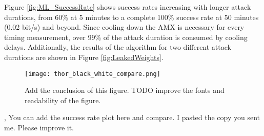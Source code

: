 Figure \ref{fig:ML_SuccessRate} shows success rates increasing with longer attack durations, from 60\% at 5 minutes to a complete 100\% success rate at 50 minutes (0.02 bit/s) and beyond. Since cooling down the AMX is necessary for every timing measurement, over 99\% of the attack duration is consumed by cooling delays. Additionally, the results of the algorithm for two different attack durations are shown in Figure \ref{fig:LeakedWeights}. 

\begin{figure}
    \centering
    \texttt{[image: thor\_black\_white\_compare.png]}
    \caption{{\color{red} Add the conclusion of this figure.  TODO improve the fonts and readability of the figure. }}
    \label{fig:thorleakage}
\end{figure}

{\color{red} , You can add the success rate plot here and compare. I pasted the copy you sent me. Please improve it.}




